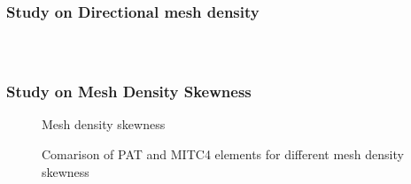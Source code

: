 \documentclass[9pt]{beamer}
\begin{document}
\begin{frame}\frametitle{Study on Directional mesh density}

\begin{figure}

\end{figure}

\begin{columns}

\begin{figure}

\end{figure}

\begin{figure}

\end{figure}

\end{columns}
\end{frame}


\begin{frame}\frametitle{Study on Mesh Density Skewness}
\begin{figure}[h]
\centering

\caption{Mesh density skewness}
\label{fig:Strip_load_SR}
\end{figure}

\begin{figure}[h!]

\caption{Comarison of PAT and MITC4 elements for different mesh density skewness}
\label{fig:Strip_SR}
\end{figure}
\end{frame}
\end{document}
